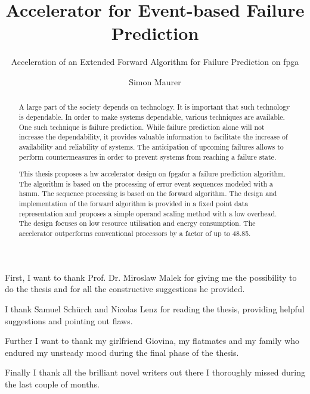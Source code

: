 \documentclass[mscthesis]{usiinfthesis}
\title{Accelerator for Event-based Failure Prediction} %
\subtitle{Acceleration of an Extended Forward Algorithm for Failure Prediction
    on \acrshort{fpga}}
\author{Simon Maurer} %
\begin{document}
\maketitle %

\frontmatter %

\begin{abstract}
    A large part of the society depends on technology. It is important
    that such technology is dependable. In order to make systems dependable,
    various techniques are available. One such technique is failure prediction.
    While failure prediction alone will not increase the dependability, it
    provides valuable information to facilitate the increase of availability
    and reliability of systems. The anticipation of upcoming failures allows to
    perform countermeasures in order to prevent systems from reaching a failure
    state.

    This thesis proposes a \acrlong{hw} accelerator design on \acrfull{fpga}for
    a failure prediction algorithm. The algorithm is based on the processing of
    error event sequences modeled with a \acrfull{hsmm}. The sequence
    processing is based on the forward algorithm. The design and implementation
    of the forward algorithm is provided in a fixed point data representation
    and proposes a simple operand scaling method with a low overhead. The
    design focuses on low resource utilisation and energy consumption. The
    accelerator outperforms conventional processors by a factor of up to 48.85.
\end{abstract}

%

\begin{acknowledgements}
First, I want to thank Prof. Dr. Miroslaw Malek for giving me the possibility
to do the thesis and for all the constructive suggestions he provided.

I thank Samuel Sch\"{u}rch and Nicolas Lenz for reading the thesis, providing
helpful suggestions and pointing out flaws.

Further I want to thank my girlfriend Giovina, my flatmates and my family who
endured my unsteady mood during the final phase of the thesis.

Finally I thank all the brilliant novel writers out there I thoroughly missed
during the last couple of months.

\end{acknowledgements}
\end{document}
